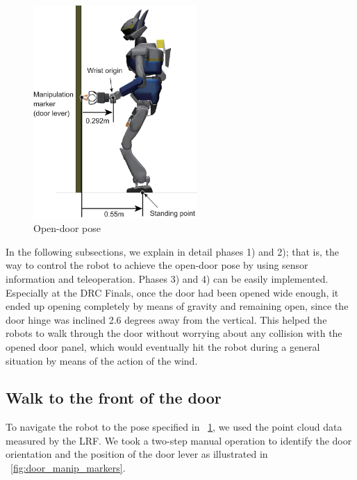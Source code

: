 \begin{figure}[t]
  \centering
  \includegraphics[width = 6.25cm]{img/door_approaching_config}
  \caption{Open-door pose}
  \label{fig:door_approaching_config}
\end{figure}



In the following subsections, we explain in detail phases 1) and 2); that is,
the way to control the robot to achieve the open-door pose by using sensor information
and teleoperation.
Phases 3) and 4) can be easily implemented. 
Especially at the DRC Finals, once the door had been opened wide enough, it ended up opening
completely by means of gravity and remaining open, since the door hinge was inclined 2.6 degrees
away from the vertical.
This helped the robots to walk through the door without worrying about any collision with
the opened door panel, which would eventually hit the robot during a general situation
by means of the action of the wind. 

\subsection{Walk to the front of the door}
%
To navigate the robot to the pose specified in \figurename~\ref{fig:door_approaching_config},
we used the point cloud data measured by the LRF. 
We took a two-step manual operation to identify the door orientation and the position of the
door lever as illustrated in \figurename~\ref{fig:door_manip_markers}.

